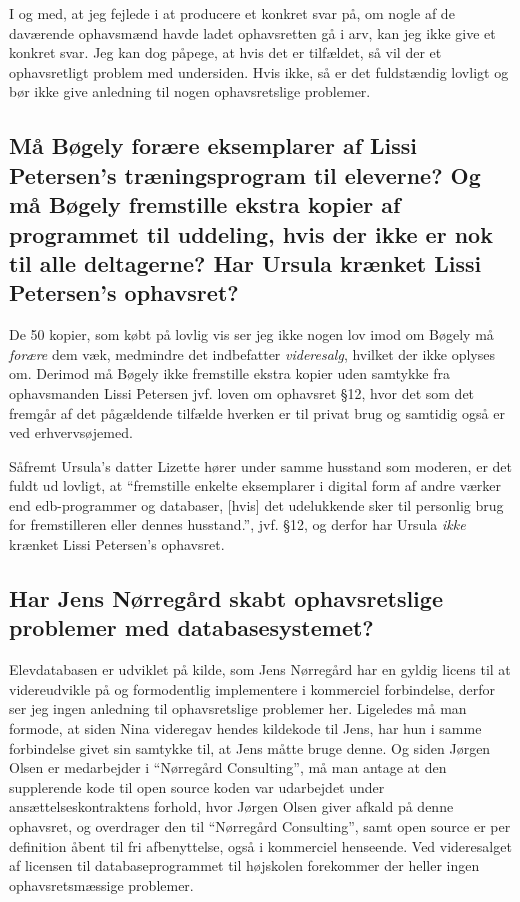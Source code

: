 \documentclass[a4paper]{article}
\begin{document}
I og med, at jeg fejlede i at producere et konkret svar på, om nogle af de
daværende ophavsmænd havde ladet ophavsretten gå i arv, kan jeg ikke give et
konkret svar. Jeg kan dog påpege, at hvis det er tilfældet, så vil der et
ophavsretligt problem med undersiden. Hvis ikke, så er det fuldstændig lovligt
og bør ikke give anledning til nogen ophavsretslige problemer.

\newpage
\subsection{Må Bøgely forære eksemplarer af Lissi Petersen's træningsprogram
til eleverne? Og må Bøgely fremstille ekstra kopier af programmet til
uddeling, hvis der ikke er nok til alle deltagerne? Har Ursula krænket Lissi
Petersen's ophavsret?}
De 50 kopier, som købt på lovlig vis ser jeg ikke nogen lov imod om Bøgely må
{\it forære} dem væk, medmindre det indbefatter {\it videresalg}, hvilket der
ikke oplyses om. Derimod må Bøgely ikke fremstille ekstra kopier uden samtykke
fra ophavsmanden Lissi Petersen jvf. loven om ophavsret\cite{ophav} §12, hvor
det som det fremgår af det pågældende tilfælde hverken er til privat brug og
samtidig også er ved erhvervsøjemed.

Såfremt Ursula's datter Lizette hører under samme husstand som moderen, er det
fuldt ud lovligt\cite{ophav}, at ``fremstille enkelte eksemplarer i digital
form af andre værker end edb-programmer og databaser, [hvis] det udelukkende
sker til personlig brug for fremstilleren eller dennes husstand.'', jvf. §12,
og derfor har Ursula {\it ikke} krænket Lissi Petersen's ophavsret.

\subsection{Har Jens Nørregård skabt ophavsretslige problemer med
databasesystemet?}
Elevdatabasen er udviklet på kilde, som Jens Nørregård har en gyldig licens
til at videreudvikle på og formodentlig implementere i kommerciel forbindelse,
derfor ser jeg ingen anledning til ophavsretslige problemer her. Ligeledes må
man formode, at siden Nina videregav hendes kildekode til Jens, har hun i
samme forbindelse givet sin samtykke til, at Jens måtte bruge denne. Og siden
Jørgen Olsen er medarbejder i ``Nørregård Consulting'', må man antage at den
supplerende kode til open source koden var udarbejdet under
ansættelseskontraktens forhold, hvor Jørgen Olsen giver afkald på denne
ophavsret, og overdrager den til ``Nørregård Consulting'', samt open source er
per definition åbent til fri afbenyttelse, også i kommerciel henseende. Ved
videresalget af licensen til databaseprogrammet til højskolen forekommer der
heller ingen ophavsretsmæssige problemer.
\end{document}
